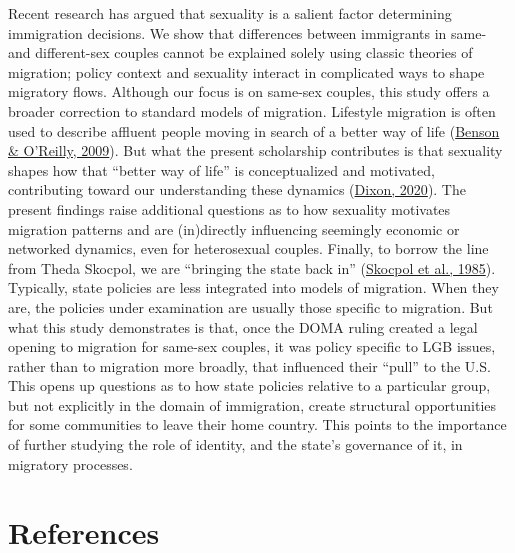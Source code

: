 \documentclass[
  11pt,
]{article}
\begin{document}
Recent research has argued that sexuality is a salient factor determining immigration decisions. We show that differences between immigrants in same- and different-sex couples cannot be explained solely using classic theories of migration; policy context and sexuality interact in complicated ways to shape migratory flows. Although our focus is on same-sex couples, this study offers a broader correction to standard models of migration. Lifestyle migration is often used to describe affluent people moving in search of a better way of life (\protect\hyperlink{ref-benson_2009}{Benson \& O'Reilly, 2009}). But what the present scholarship contributes is that sexuality shapes how that ``better way of life'' is conceptualized and motivated, contributing toward our understanding these dynamics (\protect\hyperlink{ref-dixon_2020}{Dixon, 2020}). The present findings raise additional questions as to how sexuality motivates migration patterns and are (in)directly influencing seemingly economic or networked dynamics, even for heterosexual couples. Finally, to borrow the line from Theda Skocpol, we are ``bringing the state back in'' (\protect\hyperlink{ref-skocpol_1985}{Skocpol et al., 1985}). Typically, state policies are less integrated into models of migration. When they are, the policies under examination are usually those specific to migration. But what this study demonstrates is that, once the DOMA ruling created a legal opening to migration for same-sex couples, it was policy specific to LGB issues, rather than to migration more broadly, that influenced their ``pull'' to the U.S. This opens up questions as to how state policies relative to a particular group, but not explicitly in the domain of immigration, create structural opportunities for some communities to leave their home country. This points to the importance of further studying the role of identity, and the state's governance of it, in migratory processes.

\hypertarget{references}{%
\section{References}\label{references}}

\setlength{\parindent}{-0.2in}
\setlength{\leftskip}{0.2in}
\setlength{\parskip}{8pt}

\noindent
\end{document}
